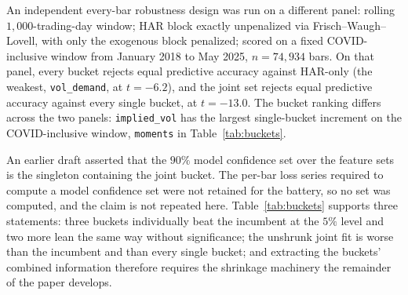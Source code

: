 An independent every-bar robustness design was run on a different panel:
rolling $1{,}000$-trading-day window; HAR block exactly unpenalized via
Frisch--Waugh--Lovell, with only the exogenous block penalized; scored on a
fixed COVID-inclusive window from January 2018 to May 2025, $n = 74{,}934$
bars. On that panel, every bucket rejects equal predictive accuracy against
HAR-only (the weakest, \texttt{vol\_demand}, at $t = -6.2$), and the joint
set rejects equal predictive accuracy against every single bucket, at
$t = -13.0$. The bucket ranking differs across the two panels:
\texttt{implied\_vol} has the largest single-bucket increment on the
COVID-inclusive window, \texttt{moments} in Table~\ref{tab:buckets}.

An earlier draft asserted that the $90\%$ model confidence set
\citep{HansenLundeNason2011} over the feature sets is the singleton
containing the joint bucket. The per-bar loss series required to compute a
model confidence set were not retained for the battery, so no set was
computed, and the claim is not repeated here.
Table~\ref{tab:buckets} supports three statements: three buckets
individually beat the incumbent at the $5\%$ level and two more lean the
same way without significance; the unshrunk joint fit is worse than the
incumbent and than every single bucket; and extracting the buckets'
combined information therefore requires the shrinkage machinery the
remainder of the paper develops.
